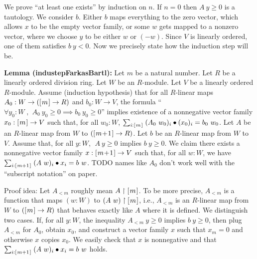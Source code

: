 \documentclass[]{article}
\renewcommand{\.}{\hskip .75pt}
\newcommand{\fin}[1]{[\.#1\.]}
\DeclareMathOperator{\st}{,\;}
\let\r=\rightarrow
\begin{document}
We prove ``at least one exists'' by induction on $n$.
If $n=0$ then $A~y \ge 0$ is a tautology.
We consider $b$. Either $b$ maps everything to the
zero vector, which allows $x$ to be the empty vector family,
or some $w$ gets mapped to a nonzero vector, where
we choose $y$ to be either $w$ or $(-w)$.
Since $V$ is linearly ordered, one of them satisfies $b~y<0$.
Now we precisely state how the induction step will be.

\medskip \noindent
\textbf{Lemma (industepFarkasBartl):}
Let $m$ be a natural number.
Let $R$ be a linearly ordered division ring.
Let $W$ be an $R$-module.
Let $V$ be a linearly ordered $R$-module.
Assume (induction hypothesis) that
for all $R$-linear maps $A_0 : W \r (\fin{m} \r R)$
and $b_0 : W \r V$, the formula
``$\forall y_0 : W \st A_0~y_0 \ge 0 \implies b_0~y_0 \ge 0$''
implies existence of a nonnegative vector family $x_0 : \fin{m} \r V$ such that,
for all $w_0 : W$, $ \sum_{i : \fin{m}}\; (A_0~w_0)_i \bullet (x_0)_i = b_0~w_0 $.
Let $A$ be an $R$-linear map from $W$ to $(\fin{m\!+\!1} \r R)$.
Let $b$ be an $R$-linear map from $W$ to~$V$.
Assume that, for all $y : W$, $\;A~y \ge 0$ implies $b~y \ge 0$.
We claim there exists a nonnegative vector family $x : \fin{m\!+\!1} \r V$
such that, for all $w : W$, we have
$ \sum_{i : \fin{m+1}}\; (A~w)_i \bullet x_i = b~w $.
TODO names like $A_0$ don't work well with the ``subscript notation'' on paper.

\medskip \noindent
Proof idea:
Let $A_{<m}$ roughly mean $A \restriction \fin{m}$.
To be more precise, $A_{<m}$ is a function that maps $(w : W)$ to
$(A~w) \restriction \fin{m}$, i.e., $A_{<m}$ is an $R$-linear map
from $W$ to $(\fin{m} \r R)$ that behaves exactly like $A$ where
it is defined.
We distinguish two cases. If, for all $y : W$, the inequality
$A_{<m}~y \ge 0$ implies $b~y \ge 0$, then plug $A_{<m}$
for $A_0$, obtain $x_0$, and construct a vector family $x$ such that
$x_m = 0$ and otherwise $x$ copies $x_0$. We easily check that
$x$ is nonnegative and that
$ \sum_{i : \fin{m+1}}\; (A~w)_i \bullet x_i = b~w $ holds.
\end{document}
